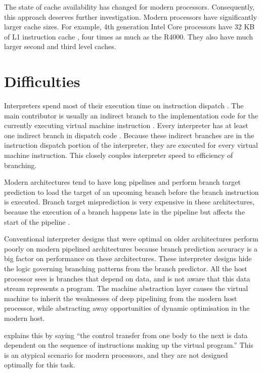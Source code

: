 		The state of cache availability has changed for modern processors. Consequently, this approach deserves further investigation. Modern processors have significantly larger cache sizes. For example, 4th generation Intel Core processors have 32 KB of L1 instruction cache \citep{optimisationreference}, four times as much as the R4000. They also have much larger second and third level caches.
		
	
		
	\section{Difficulties}
		Interpreters spend most of their execution time on instruction dispatch \citep{modernarchvm}. The main contributor is usually an indirect branch to the implementation code for the currently executing virtual machine instruction \citep{optimizingindirectbranch}. Every interpreter has at least one indirect branch in dispatch code \citep{modernarchvm}. Because these indirect branches are in the instruction dispatch portion of the interpreter, they are executed for every virtual machine instruction. This closely couples interpreter speed to efficiency of branching.
		
		Modern architectures tend to have long pipelines and perform branch target prediction to load the target of an upcoming branch before the branch instruction is executed. Branch target misprediction is very expensive in these architectures, because the execution of a branch happens late in the pipeline but affects the start of the pipeline \citep{optimizingindirectbranch}.
				
		Conventional interpreter designs that were optimal on older architectures perform poorly on modern pipelined architectures because branch prediction accuracy is a big factor on performance on these architectures. These interpreter designs hide the logic governing branching patterns from the branch predictor. All the host processor sees is branches that depend on data, and is not aware that this data stream represents a program. The machine abstraction layer causes the virtual machine to inherit the weaknesses of deep pipelining from the modern host processor, while abstracting away opportunities of dynamic optimisation in the modern host.
		
		\cite{yeti} explains this by saying ``the control transfer from one body to the next is data dependent on the sequence of instructions making up the virtual program.'' This is an atypical scenario for modern processors, and they are not designed optimally for this task.
		
